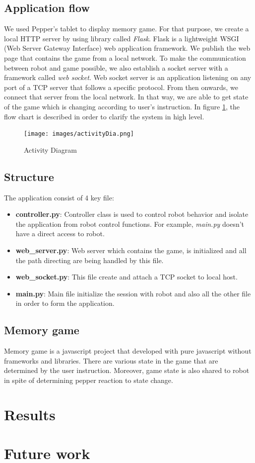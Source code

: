 \documentclass[12pt]{article}
\begin{document}
\subsection{Application flow}
We used Pepper's tablet to display memory game. For that purpose, we create a local HTTP server by using library called \textit{Flask}. Flask is a lightweight WSGI (Web Server Gateway Interface) web application framework. We publish the web page that contains the game from a local network. To make the communication between robot and game possible, we also establish a socket server with a framework called \textit{web socket}. Web socket server is an application listening on any port of a TCP server that follows a specific protocol. From then onwards,  we connect that server from the local network. In that way, we are able to get state of the game which is changing according to user's instruction. In figure \ref{fig:diagram}, the flow chart is described in order to clarify the system in high level.
\begin{figure}[H]
\centering
\texttt{[image: images/activityDia.png]}
\caption{Activity Diagram}
\label{fig:diagram}
\end{figure}
\subsection{Structure}
The application consist of 4 key file:
\begin{itemize}
\item \textbf{controller.py}: Controller class is used to control robot behavior and isolate the application from robot control functions. For example, \textit{main.py} doesn't have a direct access to robot.
\item \textbf{web\_server.py}: Web server which contains the game, is initialized and all the path directing are being handled by this file.
\item \textbf{web\_socket.py}: This file create and attach a TCP socket to local host.
\item \textbf{main.py}: Main file initialize the session with robot and also all the other file in order to form the application.
\end{itemize}
\subsection{Memory game}
Memory game is a javascript project that developed with pure javascript without frameworks and libraries. There are various state in the game that are determined by the user instruction. Moreover, game state is also shared to robot in spite of determining pepper reaction to state change.
\section{Results}
 
\newpage
\section{Future work}
 
\newpage


 
\end{document}

